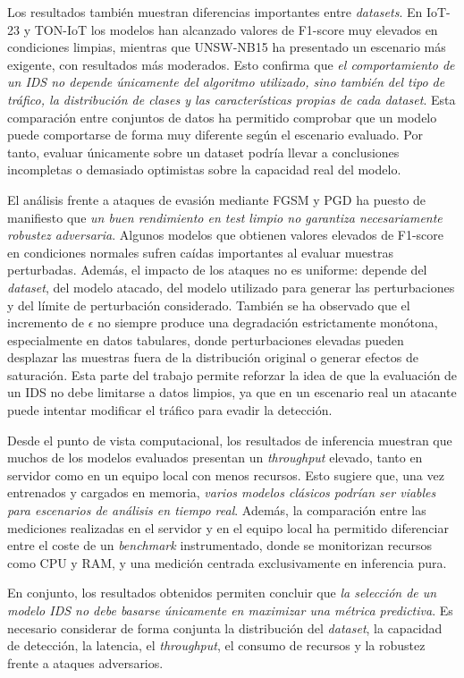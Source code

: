 Los resultados también muestran diferencias importantes entre \textit{datasets}. En IoT-23 y TON-IoT los modelos han alcanzado valores de F1-score muy elevados en condiciones limpias, mientras que UNSW-NB15 ha presentado un escenario más exigente, con resultados más moderados. Esto confirma que \textit{el comportamiento de un IDS no depende únicamente del algoritmo utilizado, sino también del tipo de tráfico, la distribución de clases y las características propias de cada dataset}. Esta comparación entre conjuntos de datos ha permitido comprobar que un modelo puede comportarse de forma muy diferente según el escenario evaluado. Por tanto, evaluar únicamente sobre un dataset podría llevar a conclusiones incompletas o demasiado optimistas sobre la capacidad real del modelo.

El análisis frente a ataques de evasión mediante FGSM y PGD ha puesto de manifiesto que \textit{un buen rendimiento en test limpio no garantiza necesariamente robustez adversaria}. Algunos modelos que obtienen valores elevados de F1-score en condiciones normales sufren caídas importantes al evaluar muestras perturbadas. Además, el impacto de los ataques no es uniforme: depende del \textit{dataset}, del modelo atacado, del modelo utilizado para generar las perturbaciones y del límite de perturbación considerado. También se ha observado que el incremento de $\epsilon$ no siempre produce una degradación estrictamente monótona, especialmente en datos tabulares, donde perturbaciones elevadas pueden desplazar las muestras fuera de la distribución original o generar efectos de saturación. Esta parte del trabajo permite reforzar la idea de que la evaluación de un IDS no debe limitarse a datos limpios, ya que en un escenario real un atacante puede intentar modificar el tráfico para evadir la detección.

Desde el punto de vista computacional, los resultados de inferencia muestran que muchos de los modelos evaluados presentan un \textit{throughput} elevado, tanto en servidor como en un equipo local con menos recursos. Esto sugiere que, una vez entrenados y cargados en memoria, \textit{varios modelos clásicos podrían ser viables para escenarios de análisis en tiempo real}. Además, la comparación entre las mediciones realizadas en el servidor y en el equipo local ha permitido diferenciar entre el coste de un \textit{benchmark} instrumentado, donde se monitorizan recursos como CPU y RAM, y una medición centrada exclusivamente en inferencia pura.

En conjunto, los resultados obtenidos permiten concluir que \textit{la selección de un modelo IDS no debe basarse únicamente en maximizar una métrica predictiva}. Es necesario considerar de forma conjunta la distribución del \textit{dataset}, la capacidad de detección, la latencia, el \textit{throughput}, el consumo de recursos y la robustez frente a ataques adversarios.


